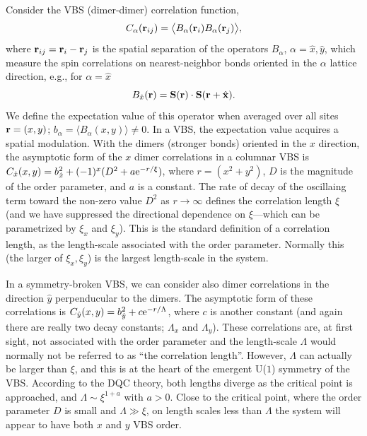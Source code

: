 \documentclass[range]{ar2e}
\begin{document}
Consider the VBS (dimer-dimer) correlation function,
\begin{equation}
C_{\alpha} ({\bf r}_{ij}) = \bigl \langle B_\alpha({\bf r}_i)B_\alpha({\bf r}_j) \bigr \rangle, 
\label{cddef}
\end{equation}
where ${\bf r}_{ij}={\bf r}_{i}-{\bf r}_{j}$ is the spatial separation of the operators $B_\alpha$, $\alpha=\hat x,\hat y$,
which measure the spin correlations on nearest-neighbor bonds oriented in the $\alpha$ lattice direction, e.g., for $\alpha=\hat x$
\begin{equation}
B_{\hat x}({\bf r})={\bf S}({\bf r}) \cdot {\bf S}({\bf r}+\hat {\bf x}).
\label{bxdef}
\end{equation}
We define the expectation value of this operator when averaged over all sites ${\bf r}=(x,y)$; $b_\alpha=\langle B_{\alpha}(x,y)\rangle \not = 0$. In a VBS, the 
expectation value acquires a spatial modulation. With the dimers (stronger bonds) oriented in the $x$ direction, the asymptotic form of the $x$ dimer correlations 
in a columnar VBS is $C_{\hat x}(x,y) = b_{\hat x}^2+(-1)^{x}(D^2+a{\rm e}^{-r/\xi})$, where $r=(x^2+y^2)$, $D$ is the magnitude of the order parameter, and $a$ 
is a constant. The rate of decay of the oscillaing term toward the non-zero value $D^2$ as $r\to \infty$ defines the correlation length $\xi$ (and we have
suppressed the directional dependence on $\xi$---which can be parametrized by $\xi_x$ and $\xi_y$). This is the standard definition of a correlation 
length, as the length-scale associated with the order parameter. Normally this (the larger of $\xi_x,\xi_y$) is the largest length-scale in the system. 

In a symmetry-broken VBS, we can consider also dimer correlations in the direction $\hat y$ perpenducular to the dimers. The asymptotic form of these correlations 
is $C_{\hat y}(x,y) = b_{\hat y}^2 + c{\rm e}^{-r/\Lambda}$, where $c$ is another constant (and again there are really two decay constants; $\Lambda_x$ and
$\Lambda_y$). These correlations are, at first sight, not associated with the order parameter and the length-scale $\Lambda$ would normally not be referred to 
as ``the correlation length''. However, $\Lambda$ can actually be larger than $\xi$, and this is at the heart of the emergent U($1$) symmetry of the VBS. 
According to the DQC theory, both lengths diverge as the critical point is approached, and $\Lambda \sim \xi^{1+a}$ with $a>0$. Close to the critical point, 
where the order parameter $D$ is small and $\Lambda \gg \xi$, on length scales less than $\Lambda$ the system will appear to have both $x$ and $y$ VBS order.
\end{document}
